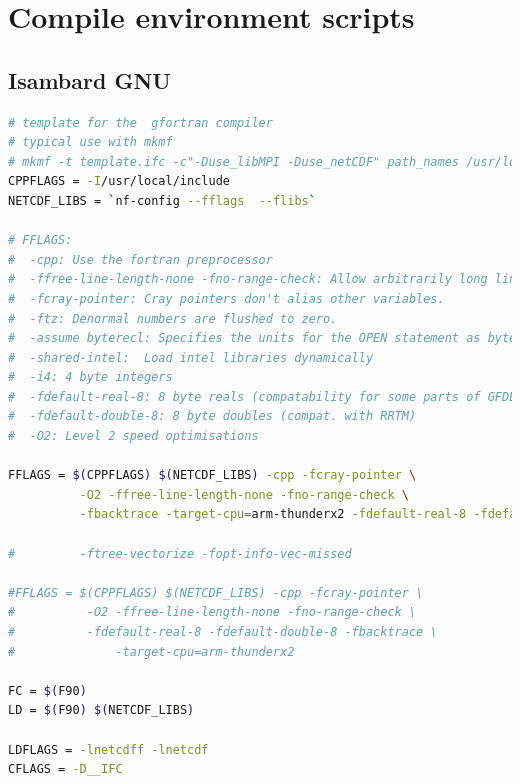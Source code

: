 \documentclass[a4paper,11pt]{report}
\begin{document}
\chapter{Compile environment scripts}
\label{apdx:compile-env}

\section*{Isambard GNU}

\begin{lstlisting}[language=Bash]
# template for the  gfortran compiler
# typical use with mkmf
# mkmf -t template.ifc -c"-Duse_libMPI -Duse_netCDF" path_names /usr/local/include
CPPFLAGS = -I/usr/local/include
NETCDF_LIBS = `nf-config --fflags  --flibs`

# FFLAGS:
#  -cpp: Use the fortran preprocessor
#  -ffree-line-length-none -fno-range-check: Allow arbitrarily long lines
#  -fcray-pointer: Cray pointers don't alias other variables.
#  -ftz: Denormal numbers are flushed to zero.
#  -assume byterecl: Specifies the units for the OPEN statement as bytes.
#  -shared-intel:  Load intel libraries dynamically
#  -i4: 4 byte integers
#  -fdefault-real-8: 8 byte reals (compatability for some parts of GFDL code)
#  -fdefault-double-8: 8 byte doubles (compat. with RRTM)
#  -O2: Level 2 speed optimisations

FFLAGS = $(CPPFLAGS) $(NETCDF_LIBS) -cpp -fcray-pointer \
          -O2 -ffree-line-length-none -fno-range-check \
          -fbacktrace -target-cpu=arm-thunderx2 -fdefault-real-8 -fdefault-double-8

#         -ftree-vectorize -fopt-info-vec-missed

#FFLAGS = $(CPPFLAGS) $(NETCDF_LIBS) -cpp -fcray-pointer \
#          -O2 -ffree-line-length-none -fno-range-check \
#          -fdefault-real-8 -fdefault-double-8 -fbacktrace \
#              -target-cpu=arm-thunderx2 

FC = $(F90)
LD = $(F90) $(NETCDF_LIBS)

LDFLAGS = -lnetcdff -lnetcdf 
CFLAGS = -D__IFC
\end{lstlisting}
\end{document}

